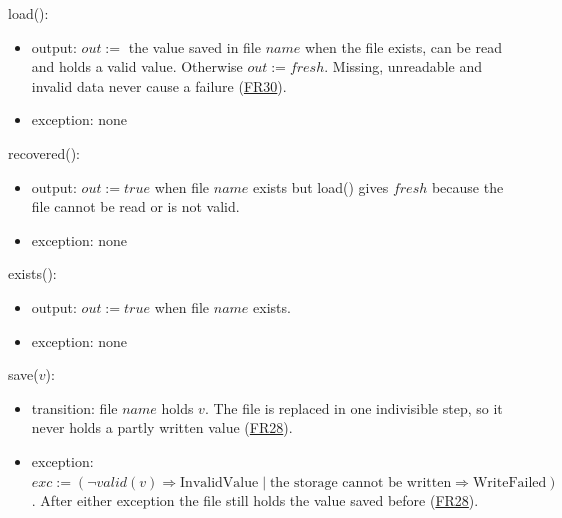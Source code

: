 \documentclass[10pt, titlepage]{article}
\newcommand{\srsurl}{https://team-hindsight.github.io/ophthamology-game/SRS/SRS.pdf}
\newcommand{\srsitemref}[2]{\href{\srsurl\#nameddest=#1}{#2}}
\newcommand{\T}[1]{\mathit{#1}}          %
\newcommand{\out}{\mathit{out}}
\newcommand{\exc}{\mathit{exc}}
\newcommand{\true}{\mathit{true}}
\begin{document}
\begin{samepage}
\noindent load():
\begin{itemize}
\item output: $\out :=$ the value saved in file $\T{name}$ when the file
  exists, can be read and holds a valid value. Otherwise $\out := \T{fresh}$.
  Missing, unreadable and invalid data never cause a failure
  (\srsitemref{FR_CorruptData}{FR30}).
\item exception: none
\end{itemize}
\end{samepage}
\par\pagebreak[0]

\begin{samepage}
\noindent recovered():
\begin{itemize}
\item output: $\out := \true$ when file $\T{name}$ exists but load() gives
  $\T{fresh}$ because the file cannot be read or is not valid.
\item exception: none
\end{itemize}
\end{samepage}
\par\pagebreak[0]

\begin{samepage}
\noindent exists():
\begin{itemize}
\item output: $\out := \true$ when file $\T{name}$ exists.
\item exception: none
\end{itemize}
\end{samepage}
\par\pagebreak[0]

\begin{samepage}
\noindent save($v$):
\begin{itemize}
\item transition: file $\T{name}$ holds $v$. The file is replaced in one
  indivisible step, so it never holds a partly written value
  (\srsitemref{FR_PersistState}{FR28}).
\item exception: $\exc := (\neg\T{valid}(v) \Rightarrow \text{InvalidValue}
  \mid \text{the storage cannot be written} \Rightarrow \text{WriteFailed})$.
  After either exception the file still holds the value saved before
  (\srsitemref{FR_PersistState}{FR28}).
\end{itemize}
\end{samepage}
\par\pagebreak[0]
\end{document}
